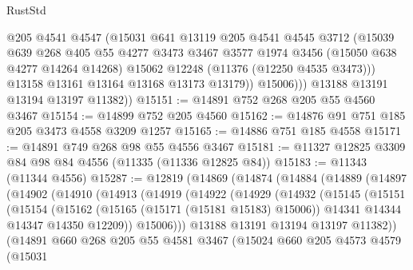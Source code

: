 \begin{lexlean}{RustStd}
\begin{coremodule}
{{{{{{{{{{{{{{{{{{{                @205
                @4541
                @4547
                (@15031
                  @641
                  @13119
                  @205
                  @4541
                  @4545
                  @3712
                  (@15039
                    @639
                    @268
                    @405
                    @55
                    @4277
                    @3473
                    @3467
                    @3577
                    @1974
                    @3456
                    (@15050 @638 @4277 @14264 @14268)
                    @15062
                    @12248
                    (@11376 (@12250 @4535 @3473)))
                  @13158
                  @13161
                  @13164
                  @13168
                  @13173
                  @13179))
              @15006)))
        @13188
        @13191
        @13194
        @13197
        @11382))
@15151 := @14891 @752 @268 @205 @55 @4560 @3467
@15154 := @14899 @752 @205 @4560
@15162 := @14876 @91 @751 @185 @205 @3473 @4558 @3209 @1257
@15165 := @14886 @751 @185 @4558
@15171 := @14891 @749 @268 @98 @55 @4556 @3467
@15181 := @11327 @12825 @3309 @84 @98 @84 @4556 (@11335 (@11336 @12825 @84))
@15183 := @11343 (@11344 @4556)
@15287 := @12819
    (@14869
      (@14874
        (@14884
          (@14889
            (@14897
              (@14902
                (@14910
                  (@14913
                    (@14919
                      (@14922
                        (@14929
                          (@14932
                            (@15145
                              (@15151
                                (@15154
                                  (@15162
                                    (@15165 (@15171 (@15181 @15183) @15006))
                                    @14341
                                    @14344
                                    @14347
                                    @14350
                                    @12209))
                                @15006)))
                          @13188
                          @13191
                          @13194
                          @13197
                          @11382))
                      (@14891
                        @660
                        @268
                        @205
                        @55
                        @4581
                        @3467
                        (@15024
                          @660
                          @205
                          @4573
                          @4579
                          (@15031
}}}}}}}}}}}}}}}}}}}
\end{coremodule}
\end{lexlean}
